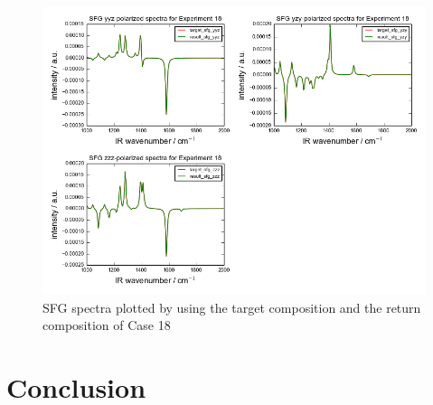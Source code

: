 \begin{figure}[!ht] 
\centering
\includegraphics[scale=0.7]{Figures/chapter4_result_target_plotting_500datapoint_sfg.png}
\caption{SFG spectra plotted by using the target composition and the return composition of Case 18} \label{fig:4.7}
\end{figure} 

\section{Conclusion}









